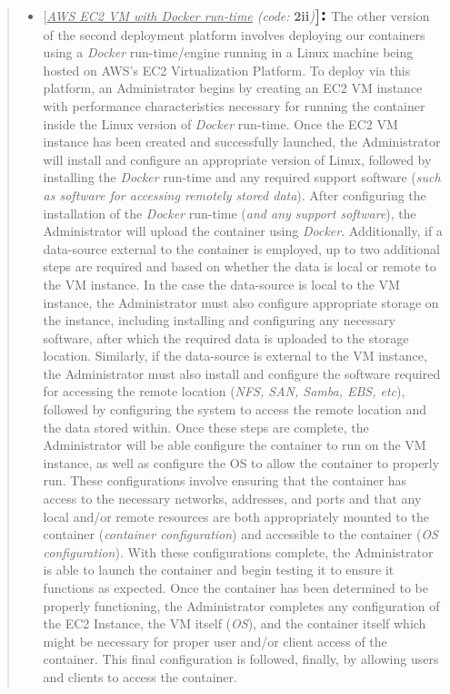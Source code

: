\documentclass{article}[12pt]
\numberwithin{equation}{section}
\begin{document}
\begin{flushleft}
\begin{spacing}{1.5}
\begin{quote}
\begin{itemize}
			\item $\bigl[$\normalsize{\emph{\underline{AWS EC2 VM with Docker run-time} (code:} \textbf{2ii}\emph{)}}$\bigr] \text{\Large{\textbf{:}}}$ The other version of the second deployment platform involves deploying our containers using a \emph{Docker} run-time/engine running in a Linux machine being hosted on AWS's EC2 Virtualization Platform.  To deploy via this platform, an Administrator begins by creating an EC2 VM instance with performance characteristics necessary for running the container inside the Linux version of \emph{Docker} run-time.  Once the EC2 VM instance has been created and successfully launched, the Administrator will install and configure an appropriate version of Linux, followed by installing the \emph{Docker} run-time and any required support software (\emph{such as software for accessing remotely stored data}).  After configuring the installation of the \emph{Docker} run-time (\emph{and any support software}), the Administrator will upload the container using \emph{Docker}.  Additionally, if a data-source external to the container is employed, up to two additional steps are required and based on whether the data is local or remote to the VM instance.  In the case the data-source is local to the VM instance, the Administrator must also configure appropriate storage on the instance, including installing and configuring any necessary software, after which the required data is uploaded to the storage location.  Similarly, if the data-source is external to the VM instance, the Administrator must also install and configure the software required for accessing the remote location (\emph{NFS, SAN, Samba, EBS, etc}), followed by configuring the system to access the remote location and the data stored within.  Once these steps are complete, the Administrator will be able configure the container to run on the VM instance, as well as configure the OS to allow the container to properly run.  These configurations involve ensuring that the container has access to the necessary networks, addresses, and ports and that any local and/or remote resources are both appropriately mounted to the container (\emph{container configuration}) and accessible to the container (\emph{OS configuration}).  With these configurations complete, the Administrator is able to launch the container and begin testing it to ensure it functions as expected.  Once the container has been determined to be properly functioning, the Administrator completes any configuration of the EC2 Instance, the VM itself (\emph{OS}), and the container itself which might be necessary for proper user and/or client access of the container.  This final configuration is followed, finally, by allowing users and clients to access the container.
		\end{itemize}
	\end{quote}
\end{spacing}



\end{flushleft}
\end{document}
